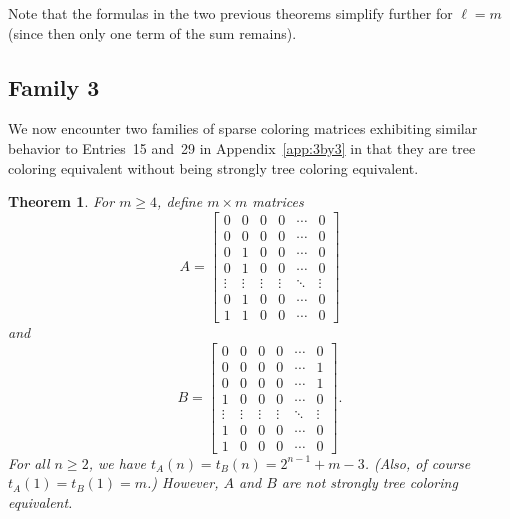 \documentclass[12pt]{amsart}
\newtheorem{theorem}{Theorem}
\begin{document}
Note that the formulas in the two previous theorems simplify further for $\ell=m$ (since then only one term of the sum remains).

\subsection{Family 3}


We now encounter two families of sparse coloring matrices exhibiting similar behavior to Entries~15 and~29 in Appendix~\ref{app:3by3} in that 
they are tree coloring equivalent without being strongly tree coloring equivalent.
\begin{theorem}\label{thm:sparsefamily}
For $m\geq4$, define $m\times m$ matrices
\[
A=\begin{bmatrix}
    0&0&0&0&\cdots&0\\
    0&0&0&0&\cdots&0\\
    0&1&0&0&\cdots&0\\
    0&1&0&0&\cdots&0\\
    \vdots&\vdots&\vdots&\vdots&\ddots&\vdots\\
    0&1&0&0&\cdots&0\\
    1&1&0&0&\cdots&0
\end{bmatrix}
\]
and
\[
B=\begin{bmatrix}
    0&0&0&0&\cdots&0\\
    0&0&0&0&\cdots&1\\
    0&0&0&0&\cdots&1\\
    1&0&0&0&\cdots&0\\
    \vdots&\vdots&\vdots&\vdots&\ddots&\vdots\\
    1&0&0&0&\cdots&0\\
    1&0&0&0&\cdots&0
\end{bmatrix}.
\]
For all $n\geq2$, we have $t_A(n)=t_B(n)=2^{n-1}+m-3$. (Also, of course $t_A(1)=t_B(1)=m$.) However, $A$ and $B$ are not strongly tree coloring equivalent.
\end{theorem}
\end{document}
